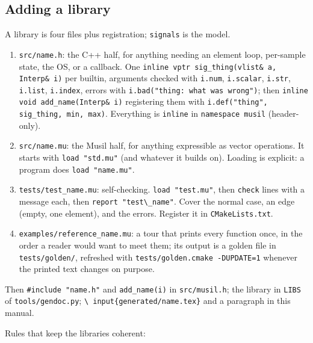 \documentclass[11pt,a4paper]{article}
\newcommand{\musil}[1]{\lstinline[style=musilinline]{#1}}
\begin{document}
\subsection{Adding a library}
\label{sec:adding-library}

A library is four files plus registration; \texttt{signals} is the model.

\begin{enumerate}[nosep]
  \item \texttt{src/name.h}: the C++ half, for anything needing an element loop,
        per-sample state, the OS, or a callback. One \texttt{inline vptr sig\_thing(vlist\&
        a, Interp\& i)} per builtin, arguments checked with \texttt{i.num}, \texttt{i.scalar},
        \texttt{i.str}, \texttt{i.list}, \texttt{i.index}, errors with \texttt{i.bad("thing:
        what was wrong")}; then \texttt{inline void add\_name(Interp\& i)} registering them
        with \texttt{i.def("thing", sig\_thing, min, max)}. Everything is \texttt{inline} in
        \texttt{namespace musil} (header-only).
  \item \texttt{src/name.mu}: the Musil half, for anything expressible as vector
        operations. It starts with \musil{load "std.mu"} (and whatever it builds on).
        Loading is explicit: a program does \musil{load "name.mu"}.
  \item \texttt{tests/test\_name.mu}: self-checking. \musil{load "test.mu"}, then
        \musil{check} lines with a message each, then \musil{report "test\_name"}. Cover the
        normal case, an edge (empty, one element), and the errors. Register it in
        \texttt{CMakeLists.txt}.
  \item \texttt{examples/reference\_name.mu}: a tour that prints every function once, in
        the order a reader would want to meet them; its output is a golden file in
        \texttt{tests/golden/}, refreshed with \texttt{tests/golden.cmake -DUPDATE=1}
        whenever the printed text changes on purpose.
\end{enumerate}

Then \texttt{\#include "name.h"} and \texttt{add\_name(i)} in \texttt{src/musil.h}; the
library in \texttt{LIBS} of \texttt{tools/gendoc.py}; \texttt{\textbackslash
input\{generated/name.tex\}} and a paragraph in this manual.

Rules that keep the libraries coherent:
\end{document}

